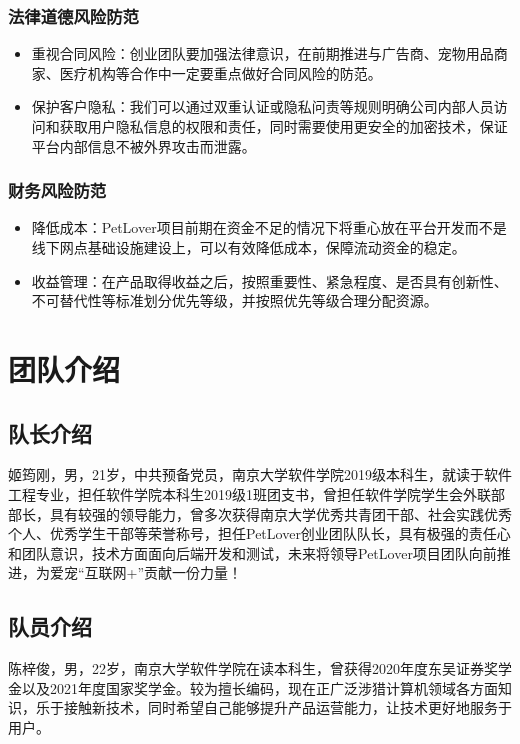 \documentclass[a4paper]{ctexart}
\begin{document}
\subsubsection{法律道德风险防范}
\begin{itemize}
  \item 重视合同风险：创业团队要加强法律意识，在前期推进与广告商、宠物用品商家、医疗机构等合作中一定要重点做好合同风险的防范。
  \item 保护客户隐私：我们可以通过双重认证或隐私问责等规则明确公司内部人员访问和获取用户隐私信息的权限和责任，同时需要使用更安全的加密技术，保证平台内部信息不被外界攻击而泄露。
\end{itemize}
\subsubsection{财务风险防范}
\begin{itemize}
  \item 降低成本：PetLover项目前期在资金不足的情况下将重心放在平台开发而不是线下网点基础设施建设上，可以有效降低成本，保障流动资金的稳定。
  \item 收益管理：在产品取得收益之后，按照重要性、紧急程度、是否具有创新性、不可替代性等标准划分优先等级，并按照优先等级合理分配资源。
\end{itemize}

\section{团队介绍}

\subsection{队长介绍}

姬筠刚，男，21岁，中共预备党员，南京大学软件学院2019级本科生，就读于软件工程专业，担任软件学院本科生2019级1班团支书，曾担任软件学院学生会外联部部长，具有较强的领导能力，曾多次获得南京大学优秀共青团干部、社会实践优秀个人、优秀学生干部等荣誉称号，担任PetLover创业团队队长，具有极强的责任心和团队意识，技术方面面向后端开发和测试，未来将领导PetLover项目团队向前推进，为爱宠“互联网+”贡献一份力量！

\subsection{队员介绍}

陈梓俊，男，22岁，南京大学软件学院在读本科生，曾获得2020年度东吴证券奖学金以及2021年度国家奖学金。较为擅长编码，现在正广泛涉猎计算机领域各方面知识，乐于接触新技术，同时希望自己能够提升产品运营能力，让技术更好地服务于用户。
\end{document}
